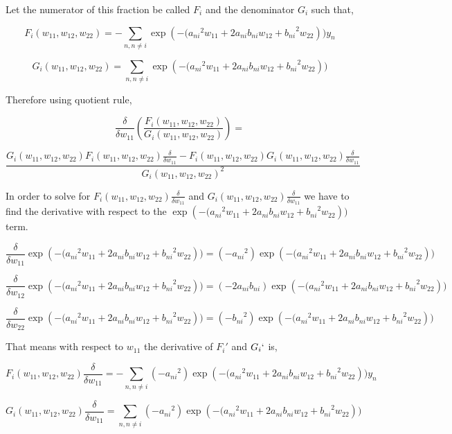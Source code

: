 \documentclass[submit]{harvardml}
\begin{document}
\begin{tcolorbox}[breakable]
Let the numerator of this fraction be called $F_i$ and the denominator $G_i$ such that,

$$ F_i(w_{11},w_{12},w_{22}) = -\sum\limits_{n, n \neq i} \exp\left(- ({a_{ni}}^2w_{11} + 2a_{ni}b_{ni}w_{12} + {b_{ni}}^2w_{22}\right))y_n $$

$$ G_i(w_{11},w_{12},w_{22}) = \sum\limits_{n, n \neq i} \exp\left(- ({a_{ni}}^2w_{11} + 2a_{ni}b_{ni}w_{12} + {b_{ni}}^2w_{22}\right))$$

Therefore using quotient rule,

$$  \frac{\delta}{\delta w_{11}} \left( \frac{ F_i(w_{11},w_{12},w_{22}) }{ G_i(w_{11},w_{12},w_{22}) } \right) = $$

$$\frac{G_i(w_{11},w_{12},w_{22}){F_i(w_{11},w_{12},w_{22})}\frac{\delta}{\delta w_{11}} - F_i(w_{11},w_{12},w_{22}){G_i(w_{11},w_{12},w_{22})}\frac{\delta}{\delta w_{11}} }{{G_i(w_{11},w_{12},w_{22})}^2}$$

In order to solve for ${F_i}(w_{11},w_{12},w_{22})\frac{\delta}{\delta w_{11}}$ and ${G_i}(w_{11},w_{12},w_{22})\frac{\delta}{\delta w_{11}}$ we have to find the derivative with respect to the $\exp\left(- ({a_{ni}}^2w_{11} + 2a_{ni}b_{ni}w_{12} + {b_{ni}}^2w_{22}\right))$ term.

$$\frac{\delta}{\delta w_{11}} \exp\left(- ({a_{ni}}^2w_{11} + 2a_{ni}b_{ni}w_{12} + {b_{ni}}^2w_{22}\right)) =  (-{a_{ni}}^2)\exp\left(- ({a_{ni}}^2w_{11} + 2a_{ni}b_{ni}w_{12} + {b_{ni}}^2w_{22}\right))$$

$$\frac{\delta}{\delta w_{12}} \exp\left(- ({a_{ni}}^2w_{11} + 2a_{ni}b_{ni}w_{12} + {b_{ni}}^2w_{22}\right)) =  (-2a_{ni}b_{ni})\exp\left(- ({a_{ni}}^2w_{11} + 2a_{ni}b_{ni}w_{12} + {b_{ni}}^2w_{22}\right))$$

$$\frac{\delta}{\delta w_{22}} \exp\left(- ({a_{ni}}^2w_{11} + 2a_{ni}b_{ni}w_{12} + {b_{ni}}^2w_{22}\right)) =  (-{b_{ni}}^2)\exp\left(- ({a_{ni}}^2w_{11} + 2a_{ni}b_{ni}w_{12} + {b_{ni}}^2w_{22}\right))$$


That means with respect to $w_{11}$ the derivative of $F_i'$ and $G_i`$ is,

$$ F_i(w_{11},w_{12},w_{22})\frac{\delta}{\delta w_{11}} = -\sum\limits_{n, n \neq i} (-{a_{ni}}^2)\exp\left(- ({a_{ni}}^2w_{11} + 2a_{ni}b_{ni}w_{12} + {b_{ni}}^2w_{22}\right))y_n $$

$$ G_i(w_{11},w_{12},w_{22})\frac{\delta}{\delta w_{11}} = \sum\limits_{n, n \neq i} (-{a_{ni}}^2)\exp\left(- ({a_{ni}}^2w_{11} + 2a_{ni}b_{ni}w_{12} + {b_{ni}}^2w_{22}\right)) $$


\end{tcolorbox}
\end{document}
